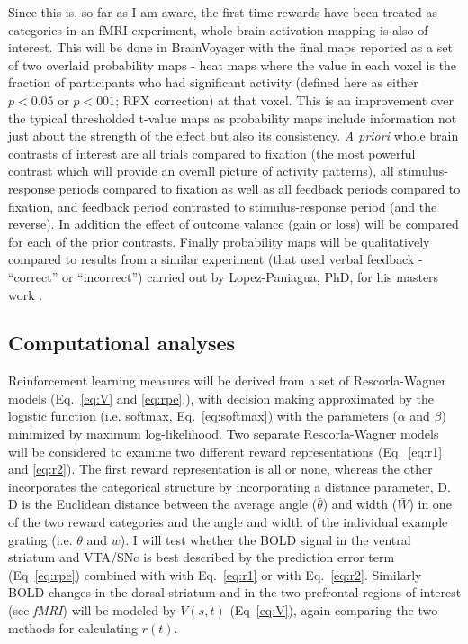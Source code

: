 \documentclass[doc,12pt]{apa}        %
\begin{document}
Since this is, so far as I am aware, the first time rewards have been treated as categories in an fMRI experiment, whole brain activation mapping is also of interest.  This will be done in BrainVoyager with the final maps reported as a set of two overlaid probability maps - heat maps where the value in each voxel is the fraction of participants who had significant activity (defined here as either $p < 0.05$ or $p < 001$; RFX correction) at that voxel.   This is an improvement over the typical thresholded t-value maps as probability maps include information not just about the strength of the effect but also its consistency.  \emph{A priori} whole brain contrasts of interest are all trials compared to fixation (the most powerful contrast which will provide an overall picture of activity patterns), all stimulus-response periods compared to fixation as well as all feedback periods compared to fixation, and feedback period contrasted to stimulus-response period (and the reverse). In addition the effect of outcome valance (gain or loss) will be compared for each of the prior contrasts.  Finally probability maps will be qualitatively compared to results from a similar experiment (that used verbal feedback - ``correct'' or ``incorrect'') carried out by Lopez-Paniagua, PhD, for his masters work \cite{LopezPaniagua:2011p8296}. 

\subsection{Computational analyses} %
\label{sub:Computational}
Reinforcement learning measures will be derived from a set of Rescorla-Wagner models (Eq.~\ref{eq:V} and \ref{eq:rpe}.), with decision making approximated by the logistic function (i.e. softmax, Eq.~\ref{eq:softmax}) with the parameters ($\alpha$ and $\beta$) minimized by maximum log-likelihood.  Two separate Rescorla-Wagner models will be considered to examine two different reward representations (Eq.~\ref{eq:r1} and \ref{eq:r2}).  The first reward representation is all or none, whereas the other incorporates the categorical structure by incorporating a distance parameter, D.  D is the Euclidean distance between the average angle ($\bar{\theta}$) and width ($\bar{W}$) in one of the two reward categories and the angle and width of the individual example grating (i.e. $\theta$ and $w$).   I will test whether the BOLD signal in the ventral striatum and VTA/SNc is best described by the prediction error term (Eq~\ref{eq:rpe}) combined with with Eq.~\ref{eq:r1} or with Eq.~\ref{eq:r2}.    Similarly BOLD changes in the dorsal striatum and in the two prefrontal regions of interest (see \emph{fMRI}) will be modeled by $V(s,t)$ (Eq~\ref{eq:V}), again comparing the two methods for calculating $r(t)$.
\end{document}
